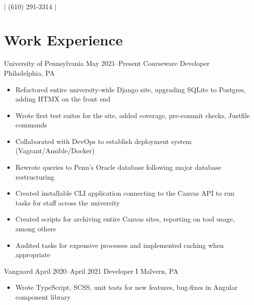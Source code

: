 \documentclass{article}
\begin{document}
\begin{flushleft}
   \\

  \vspace{0.2em}

    $|$
    \small{(610) 291-3314}
    $|$
\end{flushleft}

\section*{Work Experience}

\sectionLine

\begin{itemize}[leftmargin=0em, label={}]
    \experience
        {University of Pennsylvania}
        {May 2021--Present}
        {Courseware Developer}
        {Philadelphia, PA}
        \begin{itemize}[label=*]
          \item \small Refactored entire university-wide Django site, upgrading
            SQLite to Postgres, adding HTMX on the front end
          \item \small Wrote first test suites for the site, added coverage,
            pre-commit checks, Justfile commands
          \item \small Collaborated with DevOps to establish deployment system
            (Vagrant/Ansible/Docker)
          \item \small Rewrote queries to Penn’s Oracle database following major
            database restructuring
          \item \small Created installable CLI application connecting to the
            Canvas API to run tasks for staff across the university
          \item \small Created scripts for archiving entire Canvas sites,
            reporting on tool usage, among others
          \item \small Audited tasks for expensive processes and implemented
            caching when appropriate
        \end{itemize}
    \experience
        {Vanguard}
        {April 2020--April 2021}
        {Developer I}
        {Malvern, PA}
        \begin{itemize}[label=*]
          \item \small Wrote TypeScript, SCSS, unit tests for new features,
            bug-fixes in Angular component library

\end{itemize}
\end{itemize}
\end{document}
